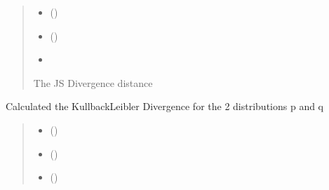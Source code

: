 \documentclass[letterpaper,10pt,english]{sphinxmanual}
\begin{document}
\begin{fulllineitems}
\begin{fulllineitems}
\begin{quote}
\begin{description}
\begin{itemize}
\item {} 
\sphinxAtStartPar
{} () \textendash{} 

\item {} 
\sphinxAtStartPar
{} () \textendash{} 

\item {} 
\sphinxAtStartPar
{} \textendash{} 

\end{itemize}

\sphinxAtStartPar
The JS Divergence distance

\end{description}\end{quote}

\end{fulllineitems}


\begin{fulllineitems}
\label{\detokenize{fldModules/myDetectors:myDetectors.myDetectors.kl_divergence}}
\pysigstartsignatures
{}
\pysigstopsignatures
\sphinxAtStartPar
Calculated the Kullback\textendash{}Leibler Divergence for the 2 distributions p and q
\begin{quote}\begin{description}
\begin{itemize}
\item {} 
\sphinxAtStartPar
{} () \textendash{} 

\item {} 
\sphinxAtStartPar
{} () \textendash{} 

\item {} 
\sphinxAtStartPar
{} () \textendash{} 


\end{itemize}
\end{description}
\end{quote}
\end{fulllineitems}
\end{fulllineitems}
\end{document}
